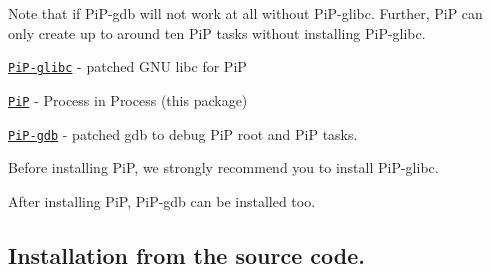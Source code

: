 Note that if Pi\-P-\/gdb will not work at all without Pi\-P-\/glibc. Further, Pi\-P can only create up to around ten Pi\-P tasks without installing Pi\-P-\/glibc.


\begin{DoxyItemize}
\item \href{https://github.com/RIKEN-SysSoft/PiP-glibc}{\tt Pi\-P-\/glibc} -\/ patched G\-N\-U libc for Pi\-P
\item \href{https://github.com/RIKEN-SysSoft/PiP}{\tt Pi\-P} -\/ Process in Process (this package)
\item \href{https://github.com/RIKEN-SysSoft/PiP-gdb}{\tt Pi\-P-\/gdb} -\/ patched gdb to debug Pi\-P root and Pi\-P tasks.
\end{DoxyItemize}

Before installing Pi\-P, we strongly recommend you to install Pi\-P-\/glibc.

After installing Pi\-P, Pi\-P-\/gdb can be installed too.

\subsection*{Installation from the source code.}


